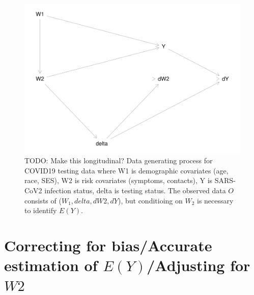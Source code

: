 \documentclass[
]{article}
\begin{document}
\begin{figure}
\centering
\includegraphics{Testing_Writeup_files/figure-latex/dag-1.pdf}
\caption{TODO: Make this longitudinal? Data generating process for
COVID19 testing data where W1 is demographic covariates (age, race,
SES), W2 is risk covariates (symptoms, contacts), Y is SARS-CoV2
infection status, delta is testing status. The observed data \(O\)
consists of (\(W_1, delta, dW2, dY\)), but conditioing on \(W_2\) is
necessary to identify \(E(Y)\).}
\end{figure}

\hypertarget{correcting-for-biasaccurate-estimation-of-eyadjusting-for-w2}{%
\section{\texorpdfstring{Correcting for bias/Accurate estimation of
\(E(Y)\)/Adjusting for
\(W2\)}{Correcting for bias/Accurate estimation of E(Y)/Adjusting for W2}}\label{correcting-for-biasaccurate-estimation-of-eyadjusting-for-w2}}
\end{document}
